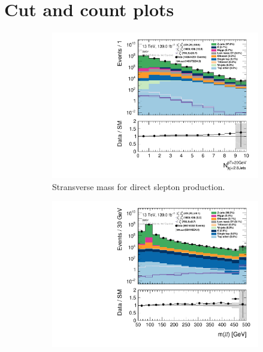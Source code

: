\chapter{Cut and count plots}
\label{sec:appCandCplots}


\begin{figure}[H]
\centering
    \begin{subfigure}[t!]{0.49\textwidth}
        \includegraphics[width=\textwidth]{Figures/SUSYcuts/hist1d_nJet20_SUSY.pdf}
    \caption{Stransverse mass for direct slepton production.}
    \label{fig:my_label}
    \end{subfigure}
    \begin{subfigure}[t!]{0.49\textwidth}
        \includegraphics[width=\textwidth]{Figures/SUSYcuts/hist1d_mll_SUSY.pdf}

\end{subfigure}
\end{figure}
